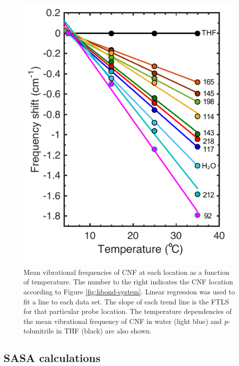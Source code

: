 \begin{figure}
    \center
    \includegraphics[width=\single]{figures-gfp-hbond/FTLS.pdf}
    \caption[FTLS measurements of each nitrile]{
        Mean vibrational frequencies of CNF at each location as a function of temperature. 
        The number to the right indicates the CNF location according to Figure \ref{fig:hbond-system}. 
        Linear regression was used to fit a line to each data set. 
        The slope of each trend line is the FTLS for that particular probe location. 
        The temperature dependencies of the mean vibrational frequency of CNF in water (light blue) and \emph{p}-tolunitrile in THF (black) are also shown.
    }
    \label{fig:hbond-ftls}
\end{figure}

\subsection{SASA calculations}

